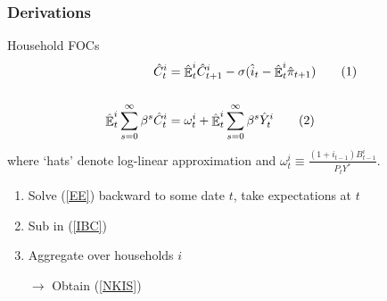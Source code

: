 \documentclass{beamer}
\DeclareMathOperator{\E}{\mathbb{E}}
\newcommand\numberthis{\addtocounter{equation}{1}\tag{\theequation}} %
\newcommand{\backupend}{
   \addtocounter{framenumberappendix}{-\value{framenumber}}
   \addtocounter{framenumber}{\value{framenumberappendix}} 
}
\begin{document}
\begin{frame}
	\frametitle{Derivations}
	\label{derivations}

Household FOCs
 \begin{align*}
\hat{C}_{t}^i & = \hat{\E}^i_t \hat{C}_{t+1}^i - \sigma(\hat{i}_{t} -\hat{\E}^i_t \hat{\pi}_{t+1})    \label{EE} \numberthis \\
\\
\hat{\E}^i_t \sum_{s=0}^{\infty}\beta^s \hat{C}^i_t& =\omega^i_t + \hat{\E}^i_t \sum_{s=0}^{\infty}\beta^s \hat{Y}^i_t \label{IBC} \numberthis
\end{align*}
where `hats' denote log-linear approximation and $\omega_t^i \equiv \frac{(1+i_{t-1})B^i_{t-1} }{P_t Y^*}$.

\begin{enumerate}
\item Solve (\ref{EE}) backward to some date $t$, take expectations at $t$ 
\item Sub in (\ref{IBC})
\item Aggregate over households $i$
\item[$\rightarrow$] Obtain (\ref{NKIS})
\end{enumerate}



\hyperlink{aggregate_LOMS}{}	


\end{frame}
%
%
%

\backupend
\end{document}

